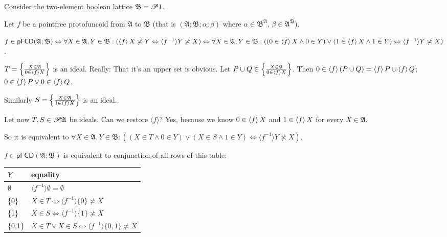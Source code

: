 Consider the two-element boolean lattice $\mathfrak{B}= \mathscr{P} 1$.

Let $f$ be a pointfree protofuncoid from $\mathfrak{A}$ to $\mathfrak{B}$
(that is $(\mathfrak{A};\mathfrak{B};\alpha;\beta)$ where $\alpha\in\mathfrak{B}^{\mathfrak{A}}$, $\beta\in\mathfrak{A}^{\mathfrak{B}}$).

$f \in \mathsf{pFCD} (\mathfrak{A}; \mathfrak{B}) \Leftrightarrow \forall X \in
\mathfrak{A}, Y \in \mathfrak{B}: (\left\langle f\right\rangle X \not\asymp Y
\Leftrightarrow \langle f^{- 1} \rangle Y \not\asymp X) \Leftrightarrow \forall X
\in \mathfrak{A}, Y \in \mathfrak{B}: ((0 \in \left\langle f\right\rangle X \wedge 0 \in
Y) \vee (1 \in \left\langle f\right\rangle X \wedge 1 \in Y) \Leftrightarrow \langle
f^{- 1} \rangle Y \not\asymp X)$.

$T = \left\{ \frac{ X \in \mathfrak{A} }{ 0 \in \langle f
\rangle X }\right\}$ is an ideal. Really: That it's an upper set is obvious.
Let $P \cup Q \in \left\{ \frac{ X \in \mathfrak{A} }{ 0 \in
\left\langle f\right\rangle X }\right\}$. Then $0 \in \left\langle f\right\rangle (P \cup Q) =
\left\langle f\right\rangle P \cup \left\langle f\right\rangle Q$; $0 \in \left\langle f\right\rangle P \vee
0 \in \left\langle f\right\rangle Q$.

Similarly $S = \left\{ \frac{ X \in \mathfrak{A} }{ 1 \in
\left\langle f\right\rangle X }\right\}$ is an ideal.

Let now $T, S \in \mathscr{P} \mathfrak{A}$ be ideals. Can we restore $\langle
f \rangle$? Yes, because we know $0 \in \left\langle f\right\rangle X$ and $1 \in
\left\langle f\right\rangle X$ for every $X \in \mathfrak{A}$.

So it is equivalent to $\forall X \in \mathfrak{A}, Y \in \mathfrak{B}: ((X
\in T \wedge 0 \in Y) \vee (X \in S \wedge 1 \in Y) \Leftrightarrow \langle
f^{- 1} \rangle Y \nasymp X)$.

$f \in \mathsf{pFCD} (\mathfrak{A}; \mathfrak{B})$ is equivalent to conjunction
of all rows of this table:

\begin{tabular}{|l|l|}
  \hline
  $Y$ & equality \\ \hline\hline
  $\emptyset$ & $\langle f^{- 1} \rangle \emptyset = \emptyset$\\
  \{0\} & $X \in T \Leftrightarrow \langle f^{- 1} \rangle \{ 0 \} \nasymp
  X$\\ \hline
  \{1\} & $X \in S \Leftrightarrow \langle f^{- 1} \rangle \{ 1 \} \nasymp
  X$\\ \hline
  \{0,1\} & $X \in T \vee X \in S \Leftrightarrow \langle f^{- 1} \rangle \{
  0, 1 \} \nasymp X$ \\
  \hline
\end{tabular}

